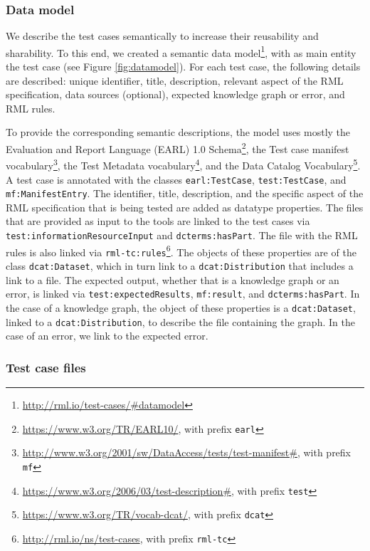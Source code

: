 \subsubsection{Data model}

We describe the test cases semantically to increase their reusability and sharability. To this end, we created a semantic data model\footnote{\url{http://rml.io/test-cases/\#datamodel}}, with as main entity the test case (see Figure \ref{fig:datamodel}). For each test case, the following details are described: unique identifier, title, description, relevant aspect of the RML specification, data sources (optional), expected knowledge graph or error, and RML rules.

To provide the corresponding semantic descriptions, the model uses mostly the Evaluation and Report Language (EARL) 1.0 Schema\footnote{\url{https://www.w3.org/TR/EARL10/}, with prefix \texttt{earl}}, the Test case manifest vocabulary\footnote{\url{http://www.w3.org/2001/sw/DataAccess/tests/test-manifest\#}, with prefix \texttt{mf}}, the Test Metadata vocabulary\footnote{\url{https://www.w3.org/2006/03/test-description\#}, with prefix \texttt{test}}, and the Data Catalog Vocabulary\footnote{\url{https://www.w3.org/TR/vocab-dcat/}, with prefix \texttt{dcat}}. A test case is annotated with the classes \verb|earl:TestCase|, \verb|test:TestCase|, and \verb|mf:ManifestEntry|. The identifier, title, description, and the specific aspect of the RML specification that is being tested are added as datatype properties. The files that are provided as input to the tools are linked to the test cases via \verb|test:informationResourceInput| and \verb|dcterms:hasPart|. The file with the RML rules is also linked via \verb|rml-tc:rules|\footnote{\url{http://rml.io/ns/test-cases}, with prefix \texttt{rml-tc}}. The objects of these properties are of the class \verb|dcat:Dataset|, which in turn link to a \verb|dcat:Distribution| that includes a link to a file. The expected output, whether that is a knowledge graph or an error, is linked via \verb|test:expectedResults|, \verb|mf:result|, and \verb|dcterms:hasPart|. In the case of a knowledge graph, the object of these properties is a \verb|dcat:Dataset|, linked to a \verb|dcat:Distribution|, to describe the file containing the graph. In the case of an error, we link to the expected error.

\subsubsection{Test case files}

